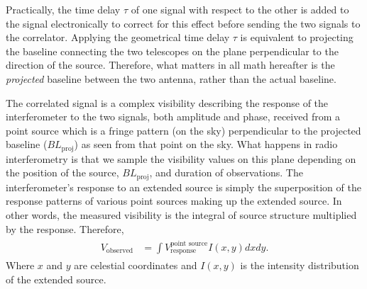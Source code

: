 \documentclass[paper=a4, fontsize=11pt]{scrartcl} %
\numberwithin{equation}{section} %
\numberwithin{figure}{section} %
\numberwithin{table}{section} %
\begin{document}
Practically, the time delay $\tau$ of one signal with respect to the other is added to the signal electronically to correct for this effect before sending the two signals to the correlator. Applying the geometrical time delay $\tau$ is equivalent to projecting the baseline connecting the two telescopes on the plane perpendicular to the direction of the source. Therefore, what matters in all math hereafter is the \emph{projected} baseline between the two antenna, rather than the actual baseline. 

The correlated signal is a complex visibility describing the response of the interferometer to the two signals, both amplitude and phase, received from a point source which is a fringe pattern (on the sky) perpendicular to the projected baseline ($BL_\mathrm{proj}$) as seen from that point on the sky. What happens in radio interferometry is that we sample the visibility values on this plane depending on the position of the source, $BL_\mathrm{proj}$, and duration of observations. The interferometer's response to an extended source is simply the superposition of the response patterns of various point sources making up the extended source. In other words, the measured visibility is the integral of source structure multiplied by the response. Therefore,
\begin{align} 
\begin{split}
V_\mathrm{observed} &= \int V^\text{point source}_\text{response} I(x, y) dx dy.
\end{split}                    
\end{align}
Where $x$ and $y$ are celestial coordinates and $I(x, y)$ is the intensity distribution of the extended source.
\end{document}
